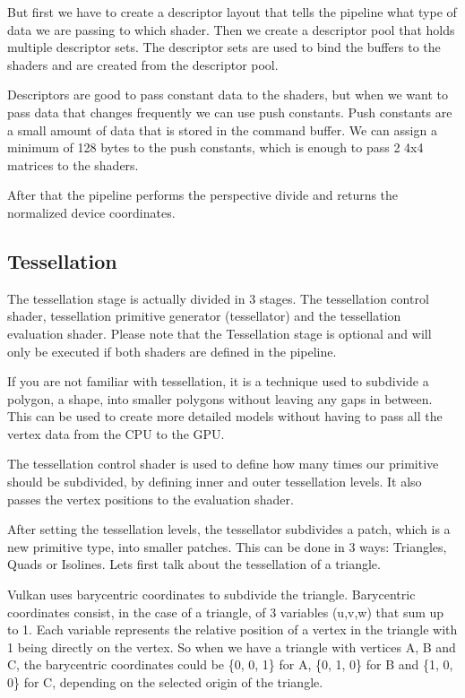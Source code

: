 \documentclass[12pt]{report} \usepackage{preamble}
\begin{document}
But first we have to create a descriptor layout that tells the pipeline
what type of data we are passing to which shader. Then we create a descriptor
pool that holds multiple descriptor sets. The descriptor sets are used to
bind the buffers to the shaders and are created from the descriptor pool. \cite{vulkan-tutorial-descriptors}

Descriptors are good to pass constant data to the shaders, but when we
want to pass data that changes frequently we can use push constants.
Push constants are a small amount of data that is stored in the command
buffer. We can assign a minimum of 128 bytes to the push constants, which
is enough to pass 2 4x4 matrices to the shaders. \cite{push-constants}

After that the pipeline performs the perspective divide and returns the
normalized device coordinates.

\subsection{Tessellation}

The tessellation stage is actually divided in 3 stages. The tessellation
control shader, tessellation primitive generator (tessellator) and the tessellation
evaluation shader. Please note that the Tessellation stage is optional and will
only be executed if both shaders are defined in the pipeline.\cite{tessellation}

If you are not familiar with tessellation, it is a technique used to
subdivide a polygon, a shape, into smaller polygons without leaving
any gaps in between. This can be used to create more detailed models
without having to pass all the vertex data from the CPU to the GPU. \cite{tessellation}

The tessellation control shader is used to define how many times
our primitive should be subdivided, by defining inner and outer tessellation levels.
It also passes the vertex positions to the evaluation shader. \cite{tessellation}

After setting the tessellation levels, the tessellator subdivides a patch, which is
a new primitive type, into smaller patches.
This can be done in 3 ways: Triangles, Quads or Isolines.
Lets first talk about the tessellation of a triangle.

Vulkan uses barycentric coordinates to subdivide the triangle. Barycentric
coordinates consist, in the case of a triangle, of 3 variables (u,v,w) that sum up to 1.
Each variable represents the relative position of a vertex in the triangle with 1 being directly
on the vertex. So when we have a triangle with vertices A, B and C, the barycentric coordinates
could be \{0, 0, 1\} for A, \{0, 1, 0\} for B and \{1, 0, 0\} for C, depending on the selected
origin of the triangle. \cite{tessellation}
\end{document}
